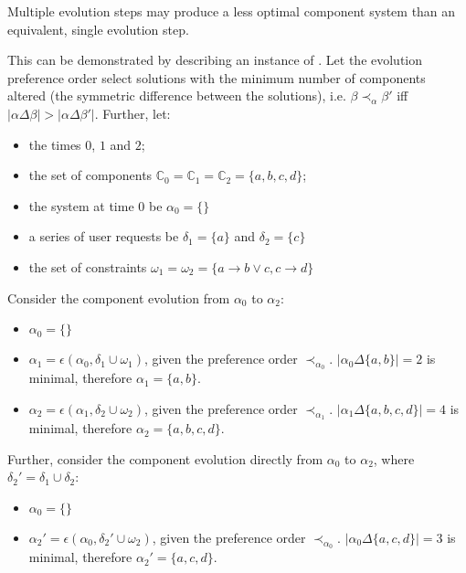 \begin{obs}
Multiple evolution steps may produce a less optimal component system than an equivalent, single evolution step.
\end{obs}

This can be demonstrated by describing an instance of \modelname.
Let the evolution preference order select solutions with the minimum number of components altered (the symmetric difference between the solutions), 
i.e. $\beta \prec_{\alpha} \beta'$ iff $|\alpha \Delta \beta| > |\alpha \Delta \beta'|$.
Further, let:
\begin{itemize}
  \item the times $0$, $1$ and $2$;
  \item the set of components $\mathbb{C}_0 = \mathbb{C}_1 = \mathbb{C}_2 = \{a,b,c,d\}$;
  \item the system at time $0$ be $\alpha_0 = \{\}$
  \item a series of user requests be $\delta_1 = \{a\}$ and $ \delta_2 = \{c\}$
  \item the set of constraints $\omega_1 = \omega_2 = \{a \rightarrow b \vee c, c \rightarrow d\}$
\end{itemize}

Consider the component evolution from $\alpha_0$ to $\alpha_2$:
\begin{itemize}
  \item $\alpha_0 = \{\}$
  \item $\alpha_1 = \epsilon(\alpha_0,\delta_1 \cup \omega_1)$, given the preference order $\prec_{\alpha_0}$. $|\alpha_0 \Delta \{a,b\}| = 2$ is minimal, therefore $\alpha_1 = \{a,b\}$.
  \item $\alpha_2 = \epsilon(\alpha_1,\delta_2 \cup \omega_2)$, given the preference order $\prec_{\alpha_1}$. $|\alpha_1 \Delta \{a,b,c,d\}| = 4$ is minimal, therefore $\alpha_2 = \{a,b,c,d\}$.
\end{itemize}

Further, consider the component evolution directly from $\alpha_0$ to $\alpha_2$, where $\delta_2' = \delta_1 \cup \delta_2$:
\begin{itemize}
  \item $\alpha_0 = \{\}$
  \item $\alpha_2' = \epsilon(\alpha_0,\delta_2' \cup \omega_2)$, given the preference order $\prec_{\alpha_0}$. $|\alpha_0 \Delta \{a,c,d\}| = 3$ is minimal, therefore $\alpha_2' = \{a,c,d\}$.
\end{itemize}


